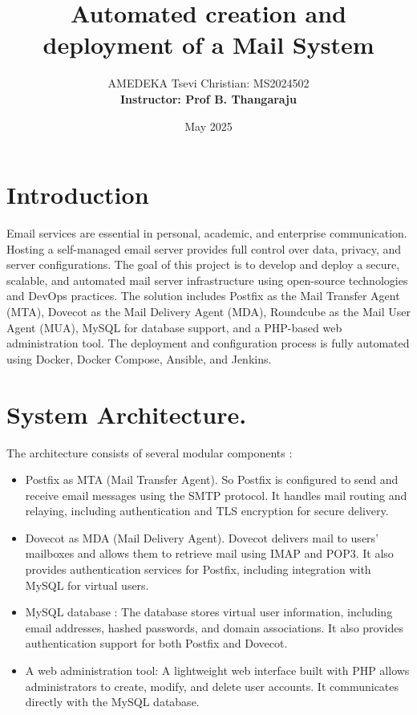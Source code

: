\documentclass[12pt]{article}
\title{\textbf{Automated creation and deployment of a Mail System}}
\author{
    AMEDEKA Tsevi Christian: MS2024502
    \\[2\baselineskip]
    \textbf{Instructor: Prof B. Thangaraju}
}
\date{May 2025}
\begin{document}
\maketitle
\newpage
\listoffigures
\newpage

\section{Introduction}

Email services are essential in personal, academic, and enterprise communication. Hosting a self-managed email server provides full control over data, privacy, and server configurations. The goal of this project is to develop and deploy a secure, scalable, and automated mail server infrastructure using open-source technologies and DevOps practices. The solution includes Postfix as the Mail Transfer Agent (MTA), Dovecot as the Mail Delivery Agent (MDA), Roundcube as the Mail User Agent (MUA), MySQL for database support, and a PHP-based web administration tool. The deployment and configuration process is fully automated using Docker, Docker Compose, Ansible, and Jenkins.

\section{System Architecture. }
The architecture consists of several modular components :
\begin{itemize}
    \item Postfix as MTA (Mail Transfer Agent). So Postfix is configured to send and receive email messages using the SMTP protocol. It handles mail routing and relaying, including authentication and TLS encryption for secure delivery.

    \item Dovecot as MDA (Mail Delivery Agent).  Dovecot delivers mail to users' mailboxes and allows them to retrieve mail using IMAP and POP3. It also provides authentication services for Postfix, including integration with MySQL for virtual users.

    \item MySQL database : The database stores virtual user information, including email addresses, hashed passwords, and domain associations. It also provides authentication support for both Postfix and Dovecot.

    \item A web administration tool: A lightweight web interface built with PHP allows administrators to create, modify, and delete user accounts. It communicates directly with the MySQL database.

\end{itemize}
\end{document}
